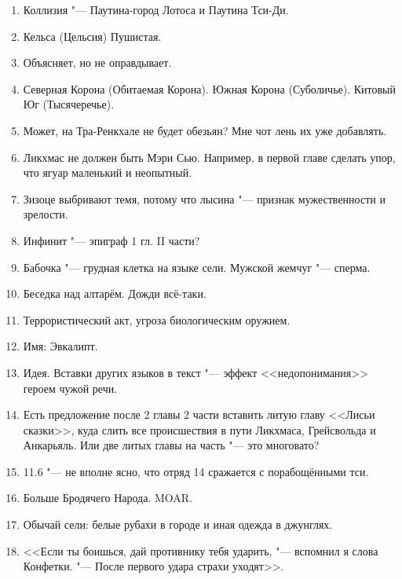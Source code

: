 \documentclass[a4paper,10pt]{book}
\begin{document}
\begin{enumerate}
\item Коллизия "--- Паутина-город Лотоса и Паутина Тси-Ди.

\item Кельса (Цельсия) Пушистая.

\item Объясняет, но не оправдывает.

\item Северная Корона (Обитаемая Корона). Южная Корона (Суболичье). Китовый Юг (Тысячеречье). 

\item Может, на Тра-Ренкхале не будет обезьян? Мне чот лень их уже добавлять.

\item Ликхмас не должен быть Мэри Сью. Например, в первой главе сделать упор, что ягуар маленький и неопытный.

\item Зизоце выбривают темя, потому что лысина "--- признак мужественности и зрелости.

\item Инфинит "--- эпиграф 1 гл. II части?

\item Бабочка "--- грудная клетка на языке сели. Мужской жемчуг "--- сперма.

\item Беседка над алтарём. Дожди всё-таки.

\item Террористический акт, угроза биологическим оружием.

\item Имя: Эвкалипт.

\item Идея. Вставки других языков в текст "--- эффект <<недопонимания>> героем чужой речи.

\item Есть предложение после 2 главы 2 части вставить литую главу <<Лисьи сказки>>, куда слить все происшествия в пути Ликхмаса, Грейсвольда и Анкарьяль. Или две литых главы на часть "--- это многовато?

\item 11.6 "--- не вполне ясно, что отряд 14 сражается с порабощёнными тси.

\item Больше Бродячего Народа. MOAR.

\item Обычай сели: белые рубахи в городе и иная одежда в джунглях.

\item <<Если ты боишься, дай противнику тебя ударить, "--- вспомнил я слова Конфетки. "--- После первого удара страхи уходят>>.


\end{enumerate}
\end{document}
